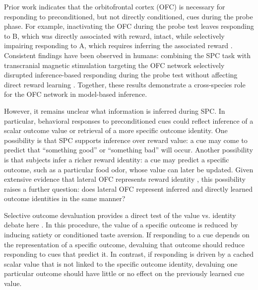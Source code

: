 \documentclass[12pt,letterpaper]{article}
\begin{document}
Prior work indicates that the orbitofrontal cortex (OFC) is necessary for responding to preconditioned, but not directly conditioned, cues during the probe phase. For example, inactivating the OFC during the probe test leaves responding to B, which was directly associated with reward, intact, while selectively impairing responding to A, which requires inferring the associated reward \cite{jones12}. Consistent findings have been observed in humans: combining the SPC task with transcranial magnetic stimulation targeting the OFC network selectively disrupted inference-based responding during the probe test without affecting direct reward learning \cite{wang2020targeted}. Together, these results demonstrate a cross-species role for the OFC network in model-based inference.



However, it remains unclear what information is inferred during SPC. In particular, behavioral responses to preconditioned cues could reflect inference of a scalar outcome value or retrieval of a more specific outcome identity. One possibility is that SPC supports inference over reward value: a cue may come to predict that ``something good'' or ``something bad'' will occur. Another possibility is that subjects infer a richer reward identity: a cue may predict a specific outcome, such as a particular food odor, whose value can later be updated. Given extensive evidence that lateral OFC represents reward identity \cite{howard2015identity,howard2017identity,howard2018identity,howard2021specific,liuyaoatt24,witkowski2026identity}, this possibility raises a further question: does lateral OFC represent inferred and directly learned outcome identities in the same manner?


Selective outcome devaluation provides a direct test of the value vs. identity debate here \cite{HowRey2020,liu2025distinct,hart20}. In this procedure, the value of a specific outcome is reduced by inducing satiety or conditioned taste aversion. If responding to a cue depends on the representation of a specific outcome, devaluing that outcome should reduce responding to cues that predict it. In contrast, if responding is driven by a cached scalar value that is not linked to the specific outcome identity, devaluing one particular outcome should have little or no effect on the previously learned cue value.
\end{document}
